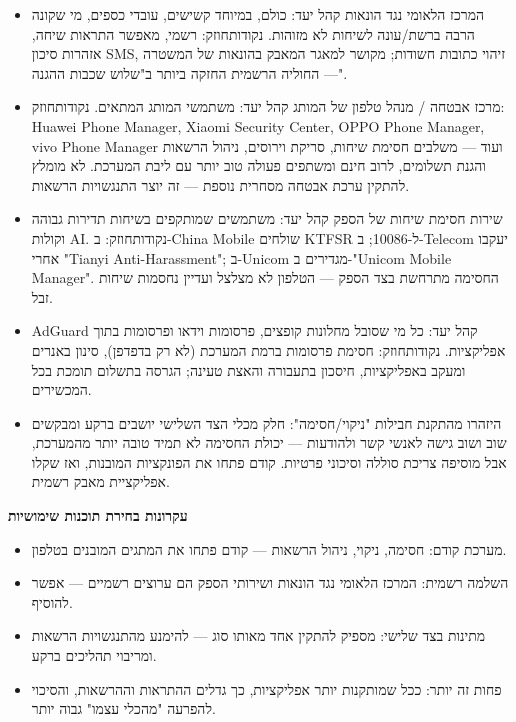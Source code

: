 
\begin{itemize}
  \item המרכז הלאומי נגד הונאות קהל יעד: כולם, במיוחד קשישים, עובדי כספים, מי שקונה הרבה ברשת/עונה לשיחות לא מזוהות. נקודותחוזק: רשמי, מאפשר התראות שיחה, אזהרות סיכון SMS, זיהוי כתובות חשודות; מקושר למאגר המאבק בהונאות של המשטרה — החוליה הרשמית החזקה ביותר ב"שלוש שכבות ההגנה".
  \item מרכז אבטחה / מנהל טלפון של המותג קהל יעד: משתמשי המותג המתאים. נקודותחוזק: Huawei Phone Manager, Xiaomi Security Center, OPPO Phone Manager, vivo Phone Manager ועוד — משלבים חסימת שיחות, סריקת וירוסים, ניהול הרשאות והגנת תשלומים, לרוב חינם ומשתפים פעולה טוב יותר עם ליבת המערכת. לא מומלץ להתקין ערכת אבטחה מסחרית נוספת — זה יוצר התנגשויות הרשאות.
  \item שירות חסימת שיחות של הספק קהל יעד: משתמשים שמותקפים בשיחות תדירות גבוהה וקולות AI. נקודותחוזק: ב-China Mobile שולחים KTFSR ל-10086; ב-Telecom יעקבו אחרי "Tianyi Anti-Harassment"; ב-Unicom מגדירים ב-"Unicom Mobile Manager". החסימה מתרחשת בצד הספק — הטלפון לא מצלצל ועדיין נחסמות שיחות זבל.
  \item AdGuard קהל יעד: כל מי שסובל מחלונות קופצים, פרסומות וידאו ופרסומות בתוך אפליקציות. נקודותחוזק: חסימת פרסומות ברמת המערכת (לא רק בדפדפן), סינון באנרים ומעקב באפליקציות, חיסכון בתעבורה והאצת טעינה; הגרסה בתשלום תומכת בכל המכשירים.
  \item היזהרו מהתקנת חבילות "ניקוי/חסימה": חלק מכלי הצד השלישי יושבים ברקע ומבקשים שוב ושוב גישה לאנשי קשר ולהודעות — יכולת החסימה לא תמיד טובה יותר מהמערכת, אבל מוסיפה צריכת סוללה וסיכוני פרטיות. קודם פתחו את הפונקציות המובנות, ואז שקלו אפליקציית מאבק רשמית.
\end{itemize}

\textbf{עקרונות בחירת תוכנות שימושיות}\par

\begin{itemize}
  \item מערכת קודם: חסימה, ניקוי, ניהול הרשאות — קודם פתחו את המתגים המובנים בטלפון.
  \item השלמה רשמית: המרכז הלאומי נגד הונאות ושירותי הספק הם ערוצים רשמיים — אפשר להוסיף.
  \item מתינות בצד שלישי: מספיק להתקין אחד מאותו סוג — להימנע מהתנגשויות הרשאות ומריבוי תהליכים ברקע.
  \item פחות זה יותר: ככל שמותקנות יותר אפליקציות, כך גדלים ההתראות וההרשאות, והסיכוי להפרעה "מהכלי עצמו" גבוה יותר.
\end{itemize}

